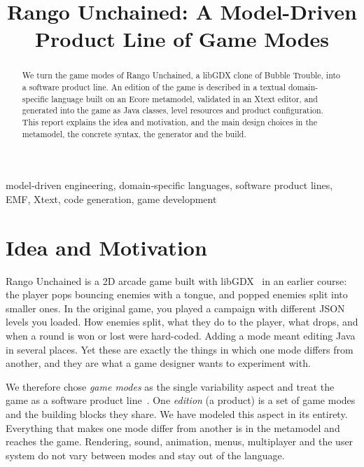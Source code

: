 \documentclass[conference]{IEEEtran}
\begin{document}
\title{Rango Unchained: A Model-Driven Product Line of Game Modes}

\author{
\and
{}
\and
{}
\and
\and
{}
\and
{}
}

\maketitle

\begin{abstract}
We turn the game modes of Rango Unchained, a libGDX clone of Bubble Trouble, into a software product
line. An edition of the game is described in a textual domain-specific language built on an Ecore
metamodel, validated in an Xtext editor, and generated into the game as Java classes, level resources
and product configuration. This report explains the idea and
motivation, and the main design choices in the metamodel, the concrete syntax, the generator and the
build.
\end{abstract}

\begin{IEEEkeywords}
model-driven engineering, domain-specific languages, software product lines, EMF, Xtext, code
generation, game development
\end{IEEEkeywords}

\section{Idea and Motivation}
Rango Unchained is a 2D arcade game built with libGDX~\cite{libgdx} in an earlier course: the player
pops bouncing enemies with a tongue, and popped enemies split into smaller ones. In the original game,
you played a campaign with different JSON levels you loaded. How enemies split, what they do to the player, what
drops, and when a round is won or lost were hard-coded. Adding a mode meant editing Java in several
places. Yet these are exactly the things in which one mode differs from another, and they are what a
game designer wants to experiment with.

We therefore chose \emph{game modes} as the single variability aspect and treat the game as a
software product line~\cite{spl}. One \emph{edition} (a product) is a set of game modes and the
building blocks they share. We have modeled this aspect in its entirety. Everything that makes one mode
differ from another is in the metamodel and reaches the game. Rendering, sound,
animation, menus, multiplayer and the user system do not vary between modes and stay out of the
language.
\end{document}
